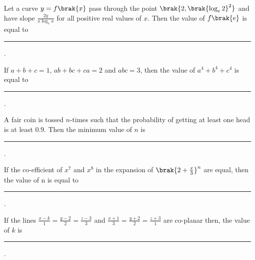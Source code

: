 \hfill{}

\item Let a curve $y=f\brak{x}$ pass through the point $\brak{2,\brak{\log_e{2}}^2}$ and have slope $\frac{2y}{x\log_e{x}}$ for all positive real values of $x$. Then the value of $f\brak{e}$ is equal to \rule{1cm}{0.15mm}.

\hfill{}

\item If $a+b+c=1$, $ab+bc+ca=2$ and $abc=3$, then the value of $a^4+b^4+c^4$ is equal to \rule{1cm}{0.15mm}.

\hfill{}

\item A fair coin is tossed $n$-times such that the probability of getting at least one head is at least $0.9$. Then the minimum value of $n$ is \rule{1cm}{0.15mm}. 

\hfill{}

\item If the co-efficient of $x^7$ and $x^8$ in the expansion of $\brak{2+\frac{x}{3}}^n$ are equal, then the value of n is equal to \rule{1cm}{0.15mm}.

\hfill{}

\item If the lines $\frac{x-k}{1}=\frac{y-2}{2}=\frac{z-3}{3}$ and $\frac{x+1}{3}=\frac{y+2}{2}=\frac{z+3}{1}$ are co-planar then, the value of $k$ is \rule{1cm}{0.15mm}.

\hfill{}

